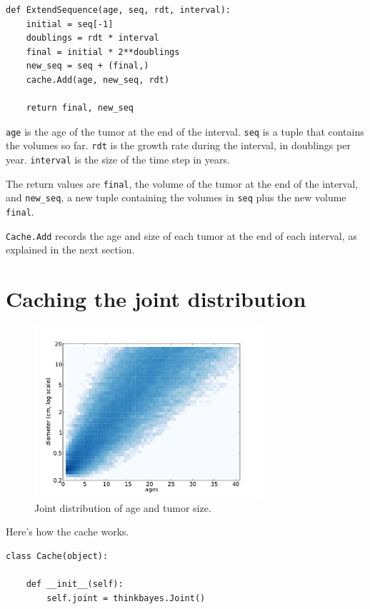 \documentclass[12pt]{book}
\begin{document}
\begin{verbatim}
def ExtendSequence(age, seq, rdt, interval):
    initial = seq[-1]
    doublings = rdt * interval
    final = initial * 2**doublings
    new_seq = seq + (final,)
    cache.Add(age, new_seq, rdt)
    
    return final, new_seq
\end{verbatim}

{\tt age} is the age of the tumor at the end of the interval.
{\tt seq} is a tuple that contains the volumes so far.  {\tt rdt} is
the growth rate during the interval, in doublings per year.
{\tt interval} is the size of the time step in years.

The return values are {\tt final}, the volume of the
tumor at the end of the interval, and \verb"new_seq", a new
tuple containing the volumes in {\tt seq} plus the new volume
{\tt final}.

{\tt Cache.Add} records the age and size of each tumor at the end
of each interval, as explained in the next section.


\section{Caching the joint distribution}

\begin{figure}
\centerline{\includegraphics[height=2.5in]{figs/kidney8.pdf}}
\caption{Joint distribution of age and tumor size.}
\label{fig.kidney8}
\end{figure}

Here's how the cache works.  

\begin{verbatim}
class Cache(object):

    def __init__(self):
        self.joint = thinkbayes.Joint()
\end{verbatim}
\end{document}
